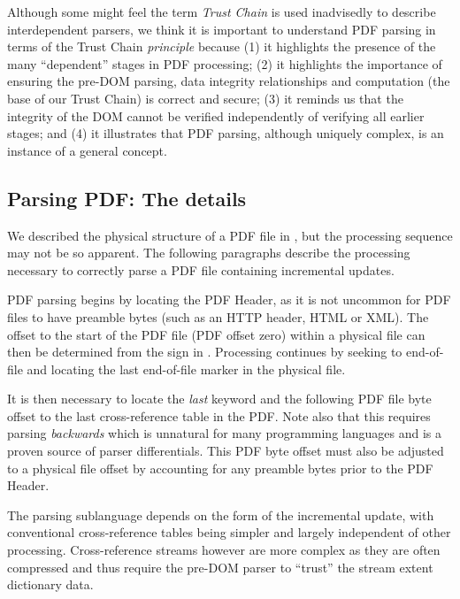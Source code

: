 
Although some might feel the term \emph{Trust Chain} is used inadvisedly to
describe interdependent parsers,
we think it is important to understand PDF parsing in terms of the
Trust Chain \emph{principle} because
%
(1) it highlights the presence of the many ``dependent'' stages
in PDF processing;
%
(2) it highlights the importance of ensuring the pre-DOM parsing, data integrity relationships and
computation (the base of our Trust Chain) is correct and secure;
%
(3) it reminds us that the integrity of the DOM cannot be verified
independently of verifying all earlier stages; and
%
(4) it illustrates that PDF parsing, although uniquely complex, is an instance of
a general concept.


\subsection{Parsing PDF: The details}
\label{sec:parsingfile}

We described the physical structure of a PDF file in ,
but the processing sequence may not be so apparent.
The following paragraphs describe the processing necessary to correctly parse a PDF file containing incremental updates.

PDF parsing begins by locating the PDF Header, as it is not uncommon for PDF files to have 
preamble bytes (such as an HTTP header, HTML or XML). The offset to the start of the PDF file 
(PDF offset zero)
within a physical file can then be determined from the \lstcd{\%} sign in . 
Processing continues by seeking to end-of-file and locating the last end-of-file marker  in the physical file.

It is then necessary to locate the \emph{last}  keyword and the following PDF file byte offset 
to the last cross-reference table in the PDF. Note also that this requires parsing \emph{backwards}
which is unnatural for many programming languages and is a proven source of parser differentials. 
This PDF byte offset must also be adjusted to a physical file offset by accounting for any preamble bytes prior to the PDF Header.

The parsing sublanguage depends on the form of the incremental update, with
conventional cross-reference tables being simpler and largely independent of
other processing. Cross-reference streams however are more complex as they are
often compressed and thus require the pre-DOM parser to ``trust'' the stream
extent dictionary data.

